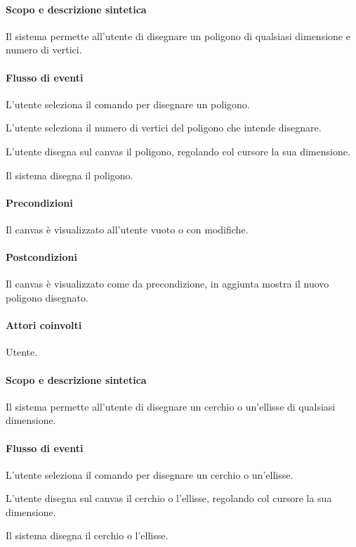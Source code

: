 \paragraph{Scopo e descrizione sintetica} 
Il sistema permette all'utente di disegnare un poligono di qualsiasi dimensione e numero di vertici.
\paragraph{Flusso di eventi}
\begin{elenconumerato}[\textbf{}]{\subsubsecindent}
\item L'utente seleziona il comando per disegnare un poligono.
\item L'utente seleziona il numero di vertici del poligono che intende disegnare.
\item L'utente disegna sul canvas il poligono, regolando col cursore la sua dimensione.
\item Il sistema disegna il poligono.
\end{elenconumerato}
\paragraph{Precondizioni} Il canvas \`e visualizzato all'utente vuoto o con modifiche.
\paragraph{Postcondizioni} Il canvas \`e visualizzato come da precondizione, in aggiunta mostra il nuovo poligono disegnato.

\paragraph{Attori coinvolti} Utente.
\paragraph{Scopo e descrizione sintetica} 
Il sistema permette all'utente di disegnare un cerchio o un'ellisse di qualsiasi dimensione.
\paragraph{Flusso di eventi}
\begin{elenconumerato}[\textbf{}]{\subsubsecindent}
\item L'utente seleziona il comando per disegnare un cerchio o un'ellisse.
\item L'utente disegna sul canvas il cerchio o l'ellisse, regolando col cursore la sua dimensione.
\item Il sistema disegna il cerchio o l'ellisse.
\end{elenconumerato}
